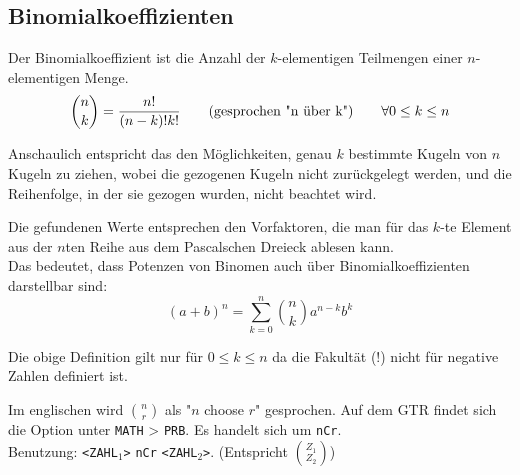 \documentclass[../MAIN/main.tex]{subfiles}
\begin{document}
\subsection{Binomialkoeffizienten}
\begin{Definition}
  Der Binomialkoeffizient ist die Anzahl der $k$-elementigen Teilmengen einer $n$-elementigen Menge.
  $$ {n\choose k} = \dfrac{n!}{(n-k)!k!} \text{\qquad (gesprochen "n über k")}\qquad \forall 0 \leq k \leq n$$
\end{Definition}
\begin{Bemerkung}
  Anschaulich entspricht das den Möglichkeiten, genau $k$ bestimmte Kugeln von $n$ Kugeln zu ziehen, wobei die gezogenen Kugeln nicht zurückgelegt werden, und die Reihenfolge, in der sie gezogen wurden, nicht beachtet wird.
\end{Bemerkung}
\begin{Bemerkung}
  Die gefundenen Werte entsprechen den Vorfaktoren, die man für das $k$-te Element aus der $n$ten Reihe aus dem Pascalschen Dreieck ablesen kann.\\
  Das bedeutet, dass Potenzen von Binomen auch über Binomialkoeffizienten darstellbar sind:
  $$(a+b)^n = \sum_{k=0}^n {n\choose k} a^{n-k}b^{k}$$
\end{Bemerkung}

\begin{Bemerkung}
  Die obige Definition gilt nur für $0 \leq k \leq n$ da die Fakultät ($!$) nicht für negative Zahlen definiert ist.
\end{Bemerkung}

\begin{GTR-Tipp}
  Im englischen wird ${n \choose r}$ als "$n$ choose $r$" gesprochen. Auf dem GTR findet sich die Option unter \texttt{MATH} > \texttt{PRB}. Es handelt sich um \texttt{nCr}.\\
  Benutzung: \texttt{<ZAHL$_1$>} \texttt{nCr} \texttt{<ZAHL$_2$>}. (Entspricht ${Z_1 \choose Z_2}$)
\end{GTR-Tipp}
\end{document}
